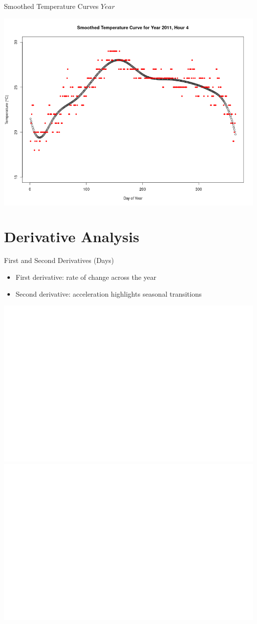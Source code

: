 \documentclass[svgnames, 12pt]{beamer}
\begin{document}
\begin{frame}{Smoothed Temperature Curves \(Year\)}
	\begin{center}
		\includegraphics[width=0.8\linewidth]{../notebooks/assets/smoothed_temp_curve_year.png}
	\end{center}
\end{frame}


\section{Derivative Analysis}

\begin{frame}{First and Second Derivatives (Days)}
	\begin{itemize}
		\item First derivative: rate of change across the year
		\item Second derivative: acceleration highlights seasonal transitions
	\end{itemize}
	\begin{center}
		\includegraphics[width=0.45\linewidth]{../notebooks/assets/derivative_day1.png}
		\hfill
		\includegraphics[width=0.45\linewidth]{../notebooks/assets/derivative_day2.png}
	\end{center}
\end{frame}
\end{document}
